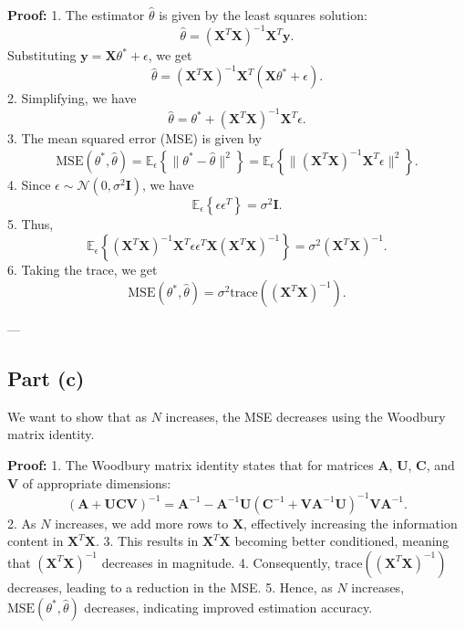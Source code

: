 \documentclass[11pt]{article}
\begin{document}
	\textbf{Proof:}
	1. The estimator $\hat{\theta}$ is given by the least squares solution:
	   \[
	   \hat{\theta} = (\mathbf{X}^T \mathbf{X})^{-1} \mathbf{X}^T \mathbf{y}.
	   \]
	   Substituting $\mathbf{y} = \mathbf{X} \theta^* + \epsilon$, we get
	   \[
	   \hat{\theta} = (\mathbf{X}^T \mathbf{X})^{-1} \mathbf{X}^T (\mathbf{X} \theta^* + \epsilon).
	   \]
	2. Simplifying, we have
	   \[
	   \hat{\theta} = \theta^* + (\mathbf{X}^T \mathbf{X})^{-1} \mathbf{X}^T \epsilon.
	   \]
	3. The mean squared error (MSE) is given by
	   \[
	   \text{MSE}(\theta^*, \hat{\theta}) = \mathbb{E}_\epsilon \left\{ \|\theta^* - \hat{\theta}\|^2 \right\} = \mathbb{E}_\epsilon \left\{ \|(\mathbf{X}^T \mathbf{X})^{-1} \mathbf{X}^T \epsilon\|^2 \right\}.
	   \]
	4. Since $\epsilon \sim \mathcal{N}(0, \sigma^2 \mathbf{I})$, we have
	   \[
	   \mathbb{E}_\epsilon \left\{ \epsilon \epsilon^T \right\} = \sigma^2 \mathbf{I}.
	   \]
	5. Thus,
	   \[
	   \mathbb{E}_\epsilon \left\{ (\mathbf{X}^T \mathbf{X})^{-1} \mathbf{X}^T \epsilon \epsilon^T \mathbf{X} (\mathbf{X}^T \mathbf{X})^{-1} \right\} = \sigma^2 (\mathbf{X}^T \mathbf{X})^{-1}.
	   \]
	6. Taking the trace, we get
	   \[
	   \text{MSE}(\theta^*, \hat{\theta}) = \sigma^2 \text{trace}((\mathbf{X}^T \mathbf{X})^{-1}).
	   \]
	
	---
	
	\subsection*{Part (c)}
	We want to show that as $N$ increases, the MSE decreases using the Woodbury matrix identity.
	
	\textbf{Proof:}
	1. The Woodbury matrix identity states that for matrices $\mathbf{A}$, $\mathbf{U}$, $\mathbf{C}$, and $\mathbf{V}$ of appropriate dimensions:
	   \[
	   (\mathbf{A} + \mathbf{U} \mathbf{C} \mathbf{V})^{-1} = \mathbf{A}^{-1} - \mathbf{A}^{-1} \mathbf{U} (\mathbf{C}^{-1} + \mathbf{V} \mathbf{A}^{-1} \mathbf{U})^{-1} \mathbf{V} \mathbf{A}^{-1}.
	   \]
	2. As $N$ increases, we add more rows to $\mathbf{X}$, effectively increasing the information content in $\mathbf{X}^T \mathbf{X}$.
	3. This results in $\mathbf{X}^T \mathbf{X}$ becoming better conditioned, meaning that $(\mathbf{X}^T \mathbf{X})^{-1}$ decreases in magnitude.
	4. Consequently, $\text{trace}((\mathbf{X}^T \mathbf{X})^{-1})$ decreases, leading to a reduction in the MSE.
	5. Hence, as $N$ increases, $\text{MSE}(\theta^*, \hat{\theta})$ decreases, indicating improved estimation accuracy.
\end{document}
